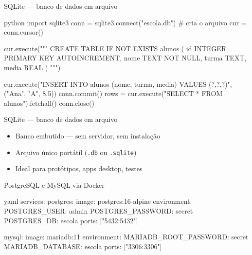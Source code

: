 \documentclass[xcolor=dvipsnames,t,aspectratio=169]{beamer}
\newcommand{\highlight}[1]{{\color{nes_dark_orange} #1}}
\begin{document}




\begin{frame}[c, fragile]{SQLite — banco de dados em arquivo}

\begin{code}{python}
import sqlite3
conn = sqlite3.connect("escola.db")   # cria o arquivo
cur  = conn.cursor()

cur.execute("""
    CREATE TABLE IF NOT EXISTS alunos (
        id      INTEGER PRIMARY KEY AUTOINCREMENT,
        nome    TEXT    NOT NULL,
        turma   TEXT,
        media   REAL
    )
""")

cur.execute("INSERT INTO alunos (nome, turma, media) VALUES (?,?,?)",
            ("Ana", "A", 8.5))
conn.commit()
rows = cur.execute("SELECT * FROM alunos").fetchall()
conn.close()
\end{code}
\end{frame}


\begin{frame}[c, fragile]{SQLite — banco de dados em arquivo}


\begin{itemize}
    \item Banco \highlight{embutido} — sem servidor, sem instalação
    \item Arquivo único portátil (\texttt{.db} ou \texttt{.sqlite})
    \item Ideal para protótipos, apps desktop, testes
\end{itemize}

\end{frame}


\begin{frame}[c, fragile]{PostgreSQL e MySQL via Docker}

\begin{code}{yaml}
services:
  postgres:
    image: postgres:16-alpine
    environment:
      POSTGRES_USER: admin
      POSTGRES_PASSWORD: secret
      POSTGRES_DB: escola
    ports: ["5432:5432"]

  mysql:
    image: mariadb:11
    environment:
      MARIADB_ROOT_PASSWORD: secret
      MARIADB_DATABASE: escola
    ports: ["3306:3306"]
\end{code}
\end{frame}
\end{document}
